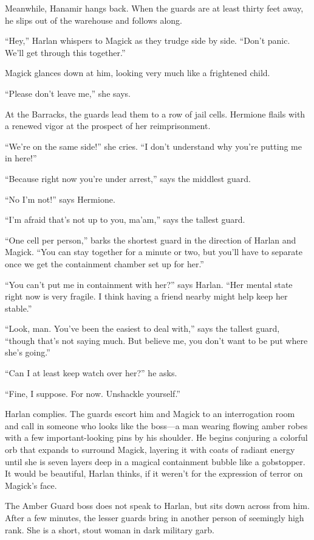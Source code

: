 \documentclass[smalldemyvopaper,11pt,twoside,onecolumn,openright,extrafontsizes]{memoir}
\begin{document}
Meanwhile, Hanamir hangs back. When the guards are at least thirty feet
away, he slips out of the warehouse and follows along.

``Hey,'' Harlan whispers to Magick as they trudge side by side. ``Don't
panic. We'll get through this together.''

Magick glances down at him, looking very much like a frightened child.

``Please don't leave me,'' she says.

At the Barracks, the guards lead them to a row of jail cells. Hermione
flails with a renewed vigor at the prospect of her reimprisonment.

``We're on the same side!'' she cries. ``I don't understand why you're
putting me in here!''

``Because right now you're under arrest,'' says the middlest guard.

``No I'm not!'' says Hermione.

``I'm afraid that's not up to you, ma'am,'' says the tallest guard.

``One cell per person,'' barks the shortest guard in the direction of
Harlan and Magick. ``You can stay together for a minute or two, but
you'll have to separate once we get the containment chamber set up for
her.''

``You can't put me in containment with her?'' says Harlan. ``Her mental
state right now is very fragile. I think having a friend nearby might
help keep her stable.''

``Look, man. You've been the easiest to deal with,'' says the tallest
guard, ``though that's not saying much. But believe me, you don't want
to be put where she's going.''

``Can I at least keep watch over her?'' he asks.

``Fine, I suppose. For now. Unshackle yourself.''

Harlan complies. The guards escort him and Magick to an interrogation
room and call in someone who looks like the boss---a man wearing flowing
amber robes with a few important-looking pins by his shoulder. He begins
conjuring a colorful orb that expands to surround Magick, layering it
with coats of radiant energy until she is seven layers deep in a magical
containment bubble like a gobstopper. It would be beautiful, Harlan
thinks, if it weren't for the expression of terror on Magick's face.

The Amber Guard boss does not speak to Harlan, but sits down across from
him. After a few minutes, the lesser guards bring in another person of
seemingly high rank. She is a short, stout woman in dark military garb.
\end{document}
